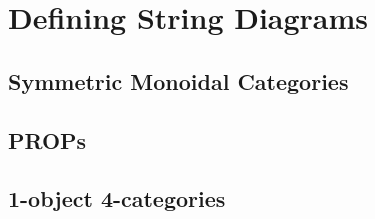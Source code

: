\section{Defining String Diagrams}

\subsection{Symmetric Monoidal Categories}

\subsection{PROPs}

\subsection{1-object 4-categories}

